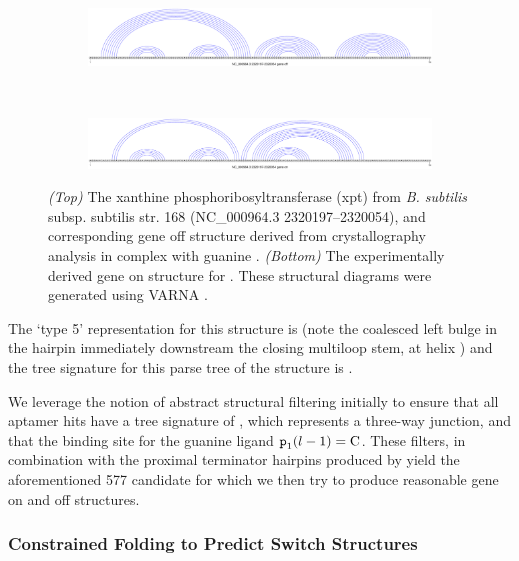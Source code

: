 \begin{figure}[!ht]
\centering
\begin{subfigure}[h]{\textwidth}
\centering
\includegraphics[width=.9\textwidth]{Figures/Ribofinder/NC_000964_3_2320197_2320054_OFF.pdf}
\end{subfigure} \\
\medskip
\begin{subfigure}[h]{\textwidth}
\centering
\includegraphics[width=.9\textwidth]{Figures/Ribofinder/NC_000964_3_2320197_2320054_ON.pdf}
\end{subfigure}
\caption{{\em (Top)} The xanthine phosphoribosyltransferase (xpt) \grb from
{\em B. subtilis} subsp. subtilis str. 168 (NC\_000964.3 2320197--2320054),
and corresponding gene off structure derived from crystallography analysis in
complex with guanine \citep{breaker:riboswitch2}. {\em (Bottom)} The experimentally
derived gene on structure for \Bsxpt. These structural diagrams were generated
using VARNA \citep{darty:2009gt}.}
\label{fig:rfinder:xptOff}
\end{figure}

The \rshapes \citep{janssen:2015cq} `type 5' representation for this structure is
\ms{[[][]][][]} (note the coalesced left bulge in the hairpin immediately
downstream the closing multiloop stem, at helix ) and the tree
signature for this parse tree of the structure is \ms{[0,1,2,2,1,1]}.

We leverage the notion of abstract structural filtering initially to ensure that
all \infernal aptamer hits have a tree signature of \ms{[0,1,2,2]}, which
represents a three-way junction, and that the binding site for the guanine ligand
${\text{\mbox{\tt p}}}_{\text{1}}(l - 1) = \text{C}$. These filters, in combination with the
proximal terminator hairpins produced by \tthp yield the aforementioned 577
candidate \grbs for which we then try to produce reasonable gene on and off
structures.

\subsubsection{Constrained Folding to Predict Switch Structures}
\label{subsubsec:rfinder:consfold}

